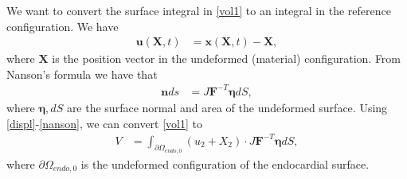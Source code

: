 \documentclass[a4paper,10pt]{article}
\begin{document}
We want to convert the surface integral in \eqref{vol1} to an
integral in the reference configuration. We have
\begin{align}
\mathbf{u}(\mathbf{X},t) &= \mathbf{x}(\mathbf{X},t)-\mathbf{X},
\label{displ}\end{align}
where $\mathbf{X}$ is the position vector in the undeformed (material) configuration.
From Nanson's formula we have that
\begin{align}
\mathbf{n}ds &= J\mathbf{F}^{-T}\mathbf{\eta}dS,
\label{nanson}\end{align}
where $\mathbf{\eta}, dS$ are the surface normal and area of the undeformed surface.
Using \eqref{displ}-\eqref{nanson}, we can convert \eqref{vol1} to
\begin{align}
V &=  \int_{\partial\Omega_{endo,0}}(u_2+X_2)\cdot
J\mathbf{F}^{-T}\mathbf{\eta}dS ,
\label{vol2}\end{align}
where $\partial\Omega_{endo,0}$ is the undeformed configuration
of the endocardial surface.



\end{document}
